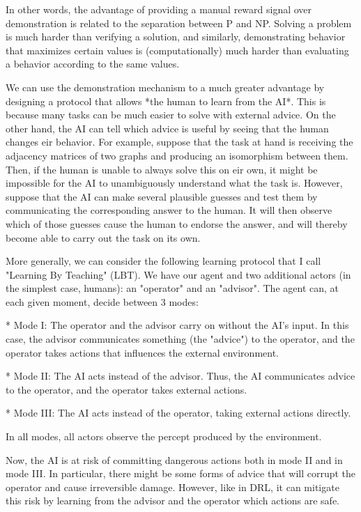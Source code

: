 \documentclass[a4paper]{article}
\begin{document}
In other words, the advantage of providing a manual reward signal over demonstration is related to the separation between P and NP. Solving a problem is much harder than verifying a solution, and similarly, demonstrating behavior that maximizes certain values is (computationally) much harder than evaluating a behavior according to the same values.

We can use the demonstration mechanism to a much greater advantage by designing a protocol that allows *the human to learn from the AI*. This is because many tasks can be much easier to solve with external advice. On the other hand, the AI can tell which advice is useful by seeing that the human changes eir behavior. For example, suppose that the task at hand is receiving the adjacency matrices of two graphs and producing an isomorphism between them. Then, if the human is unable to always solve this on eir own, it might be impossible for the AI to unambiguously understand what the task is. However, suppose that the AI can make several plausible guesses and test them by communicating the corresponding answer to the human. It will then observe which of those guesses cause the human to endorse the answer, and will thereby become able to carry out the task on its own.

More generally, we can consider the following learning protocol that I call "Learning By Teaching" (LBT). We have our agent and two additional actors (in the simplest case, humans): an "operator" and an "advisor". The agent can, at each given moment, decide between 3 modes:

* Mode I: The operator and the advisor carry on without the AI's input. In this case, the advisor communicates something (the "advice") to the operator, and the operator takes actions that influences the external environment.

* Mode II: The AI acts instead of the advisor. Thus, the AI communicates advice to the operator, and the operator takes external actions.

* Mode III: The AI acts instead of the operator, taking external actions directly.

In all modes, all actors observe the percept produced by the environment.

Now, the AI is at risk of committing dangerous actions both in mode II and in mode III. In particular, there might be some forms of advice that will corrupt the operator and cause irreversible damage. However, like in DRL, it can mitigate this risk by learning from the advisor and the operator which actions are safe.
\end{document}
